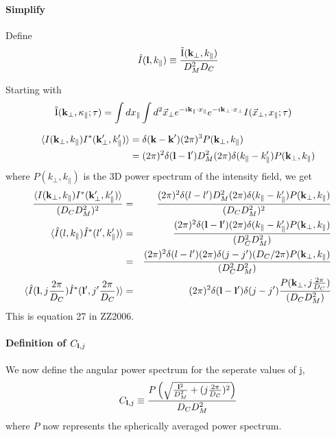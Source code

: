 \documentclass[12pt]{article}
\newcommand{\beq}{\begin{equation}}
\newcommand{\eeq}{\end{equation}}
\newcommand{\beqa}{\begin{eqnarray}}
\newcommand{\eeqa}{\end{eqnarray}}
\newcommand{\beqal}{\begin{aligned}}
\newcommand{\eeqal}{\end{aligned}}
\def\k{{\bf k}}
\def\l{{\bf l}}
\def\il{{\tilde{\rm I}}}
\numberwithin{equation}{section}
\begin{document}
\paragraph{Simplify}
Define
\beqa
\hat{I} (\l, k_\parallel) \equiv \frac{\il(\k_\perp, k_\parallel)}{D_M^2D_C}
\eeqa

Starting with
\beq
\beqal
\il(\k_\perp,\kappa_\parallel ; \tau) &= \int dx_\parallel \int d^2\vec{x}_\perp e^{-i \k_\parallel \cdot x_\parallel} e^{-i \k_\perp \cdot x_\perp} I(\vec{x}_\perp, x_\parallel; \tau) \label{eq:foreman1}
\eeqal
\eeq

\beq
\beqal
\langle I(\k_\perp, k_\parallel) I^*(\k_\perp', k_\parallel')   \rangle &= \delta(\textbf{k} - \textbf{k}') (2\pi)^3 P(\k_\perp, k_\parallel)
\\
&= (2\pi)^2 \delta(\l - \l') D_M^2 (2\pi) \delta(k_\parallel - k'_\parallel) P(\k_\perp, k_\parallel) \label{eq:3dcorr}
\eeqal
\eeq
where  $ P(k_\perp, k_\parallel) $ is the 3D power spectrum of the intensity field, we get
\beqa
\frac{\langle I(\k_\perp, k_\parallel) I^*(\k_\perp', k_\parallel')   \rangle}{(D_C D_M^2)^2} &=& \frac{(2\pi)^2 \delta(l - l') D_M^2 (2\pi) \delta(k_\parallel - k'_\parallel) P(\k_\perp, k_\parallel) }{(D_C D_M^2)^2}
\\
\langle \hat{I}(l, k_\parallel) \hat{I}^*(l', k_\parallel')   \rangle &=& \frac{(2\pi)^2 \delta(\l - \l')  (2\pi) \delta(k_\parallel - k'_\parallel) P(\k_\perp, k_\parallel) }{(D_C^2 D_M^2)}
\\
&=& \frac{(2\pi)^2 \delta(l - l')  (2\pi) \delta(j - j') (D_C/2\pi) P(\k_\perp, k_\parallel) }{(D_C^2 D_M^2)}
\\
\langle \hat{I}(\l, j \frac{2\pi}{D_C}) \hat{I}^*(\l', j'\frac{2\pi}{D_C})   \rangle  &=& (2\pi)^2 \delta(\l - \l') \delta(j - j')  \frac{P(\k_\perp, j\frac{2\pi}{D_C}) }{(D_C D_M^2)}
\eeqa
This is equation 27 in ZZ2006.

\paragraph{Definition of $ C_{\l,j} $}
We now define the angular power spectrum for the seperate values of j, 
\beqa
C_{\l,j} \equiv \frac{P \left( \sqrt{\frac{\l^2}{D_M^2} + (j\frac{2\pi}{D_C})^2} \right)}{D_C D_M^2}
\eeqa
where $ P $ now represents the spherically averaged power spectrum.
\end{document}
